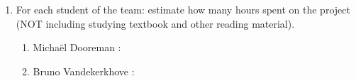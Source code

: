 
\begin{enumerate}
\item	For each student of the team: estimate how many hours spent on the project (NOT including studying textbook and other reading material).
\begin{enumerate}
\item Micha\"el Dooreman : 
\item Bruno Vandekerkhove : 
\end{enumerate}
\end{enumerate}